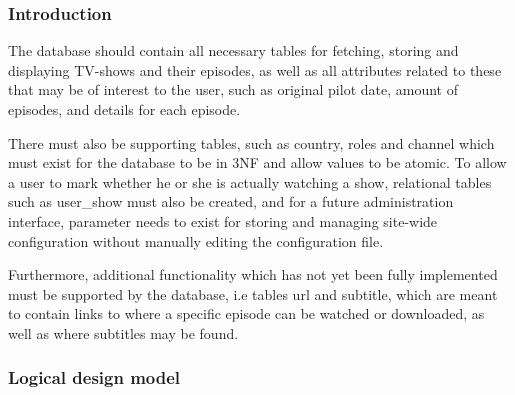 \subsubsection{Introduction}
The database should contain all necessary tables for fetching, storing and displaying TV-shows and their episodes, as well as all attributes related to these that may be of interest to the user, such as original pilot date, amount of episodes, and details for each episode. 

There must also be supporting tables, such as country, roles and channel  which must exist for the database to be in 3NF and allow values to be atomic. To allow a user to mark whether he or she is actually watching a show, relational tables such as user\_show must also be created, and for a future administration interface, parameter needs to exist for storing and managing site-wide configuration without manually editing the configuration file.

Furthermore, additional functionality which has not yet been fully implemented must be supported by the database, i.e tables url and subtitle, which are meant to contain links to where a specific episode can be watched or downloaded, as well as where subtitles may be found. 

\subsubsection{Logical design model}

